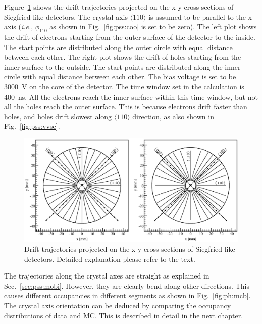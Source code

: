 Figure~\ref{fig:pss:trjs} shows the drift trajectories projected on the x-y cross sections of Siegfried-like detectors. The crystal axis $\langle 110 \rangle$ is assumed to be parallel to the x-axis (\textit{i.e.}, $\phi_{110}$ as shown in Fig.~\ref{fig:pss:coo} is set to be zero). The left plot shows the drift of electrons starting from the outer surface of the detector to the inside. The start points are distributed along the outer circle with equal distance between each other. The right plot shows the drift of holes starting from the inner surface to the outside. The start points are distributed along the inner circle with equal distance between each other. The bias voltage is set to be 3000~V on the core of the detector. The time window set in the calculation is 400~ns. All the electrons reach the inner surface within this time window, but not all the holes reach the outer surface. This is because electrons drift faster than holes, and holes drift slowest along $\langle 110 \rangle$ direction, as also shown in Fig.~\ref{fig:pss:vvse}.
\begin{figure}[tbhp]
\centering
\includegraphics[width=\textwidth]{trjs}
\caption{Drift trajectories projected on the x-y cross sections of Siegfried-like detectors. Detailed explanation please refer to the text.}
\label{fig:pss:trjs}
\end{figure}

The trajectories along the crystal axes are straight as explained in Sec.~\ref{sec:pss:mobi}. However, they are clearly bend along other directions. This causes different occupancies in different segments as shown in Fig.~\ref{fig:ph:mcb}. The crystal axis orientation can be deduced by comparing the occupancy distributions of data and MC. This is described in detail in the next chapter.


